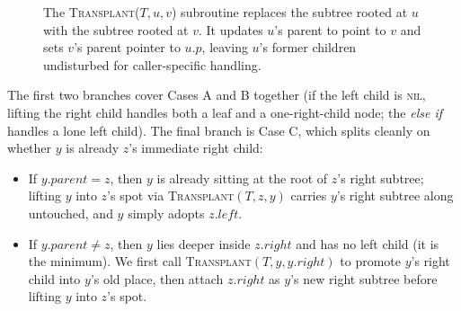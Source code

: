 \begin{figure}[h]
\caption{The \textsc{Transplant}($T, u, v$) subroutine replaces the subtree rooted at $u$ with the subtree rooted at $v$. It updates $u$'s parent to point to $v$ and sets $v$'s parent pointer to $u.p$, leaving $u$'s former children undisturbed for caller-specific handling.}
\label{ch12:fig-transplant}
\end{figure}

\begin{algorithm}[H]
\caption{\textsc{Tree-Delete}($T$, $z$)}
\end{algorithm}

The first two branches cover Cases A and B together (if the left child is \textsc{nil}, lifting
the right child handles both a leaf and a one-right-child node; the \emph{else if} handles a
lone left child). The final branch is Case C, which splits cleanly on whether $y$ is already $z$'s
immediate right child:
\begin{itemize}
  \item If $y.\mathit{parent} = z$, then $y$ is already sitting at the root of $z$'s right subtree;
        lifting $y$ into $z$'s spot via \textsc{Transplant}$(T, z, y)$ carries $y$'s right subtree
        along untouched, and $y$ simply adopts $z.\mathit{left}$.
  \item If $y.\mathit{parent} \ne z$, then $y$ lies deeper inside $z.\mathit{right}$ and has no left
        child (it is the minimum). We first call \textsc{Transplant}$(T, y, y.\mathit{right})$ to
        promote $y$'s right child into $y$'s old place, then attach $z.\mathit{right}$ as $y$'s new
        right subtree before lifting $y$ into $z$'s spot.
\end{itemize}

